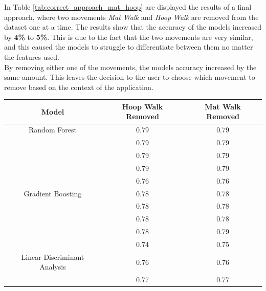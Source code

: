                 In Table \ref{tab:correct_approach_mat_hoop} are displayed the results of a final approach, where two movements \textit{Mat Walk} and \textit{Hoop Walk} are removed from the dataset one at a time. The results show that the accuracy of the models increased by \textbf{4\%} to \textbf{5\%}. This is due to the fact that the two movements are very similar, and this caused the models to struggle to differentiate between them no matter the features used. \\
                By removing either one of the movements, the models accuracy increased by the same amount. This leaves the decision to the user to choose which movement to remove based on the context of the application. 

                \begin{table}[htbp]
                    \centering
                    \begin{tabular}{|c|c|c|}
                    \hline
                    \textbf{Model} & \textbf{Hoop Walk Removed} & \textbf{Mat Walk Removed} \\ \hline
                        Random Forest                   & 0.79 & 0.79 \\ 
                                                        & 0.79 & 0.79 \\ 
                                                        & 0.79 & 0.79 \\ 
                                                        & 0.79 & 0.79 \\
                                                        & 0.76 & 0.76 \\ 
                                                        \hline
                        Gradient Boosting               & 0.78 & 0.78 \\ 
                                                        & 0.78 & 0.78 \\ 
                                                        & 0.78 & 0.78 \\ 
                                                        & 0.78 & 0.79 \\
                                                        & 0.74 & 0.75 \\
                                                        \hline
                        Linear Discriminant Analysis    & 0.76 & 0.76 \\ 
                                                        & 0.77 & 0.77 \\ 

\end{tabular}
\end{table}
